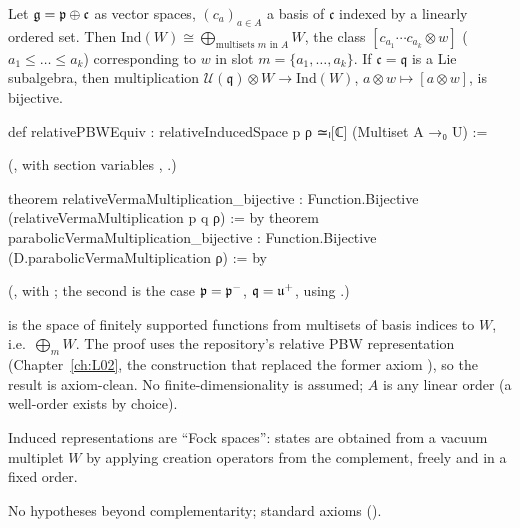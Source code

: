 \begin{theorem}\label{ch18:thm:relpbw}
Let $\mathfrak{g}=\mathfrak{p}\oplus\mathfrak c$ as vector spaces, $(c_a)_{a\in A}$ a basis of $\mathfrak c$ indexed by a linearly ordered set.  Then
$\mathrm{Ind}(W)\cong\bigoplus_{\text{multisets }m\text{ in }A}W$, the class $[c_{a_1}\cdots c_{a_k}\otimes w]$ ($a_1\le\dots\le a_k$) corresponding to $w$ in
slot $m=\{a_1,\dots,a_k\}$.  If $\mathfrak c=\mathfrak q$ is a Lie subalgebra, then multiplication
$\mathcal U(\mathfrak q)\otimes W\to \mathrm{Ind}(W)$, $a\otimes w\mapsto[a\otimes w]$, is bijective.
\end{theorem}
\begin{leancode}
def relativePBWEquiv : relativeInducedSpace p ρ ≃ₗ[ℂ] (Multiset A →₀ U) :=
\end{leancode}
(, with section variables , \lean{[LinearOrder A]}.)
\begin{leancode}
theorem relativeVermaMultiplication_bijective :
    Function.Bijective (relativeVermaMultiplication p q ρ) := by
theorem parabolicVermaMultiplication_bijective :
    Function.Bijective (D.parabolicVermaMultiplication ρ) := by
\end{leancode}
(, with ; the
second is the case $\mathfrak{p}=\mathfrak{p}^-$, $\mathfrak q=\mathfrak{u}^+$, using .)
\begin{dictionary}
 is the space of finitely supported functions from multisets of basis indices to $W$, i.e.\
$\bigoplus_mW$.  The proof uses the repository's relative PBW representation  (Chapter~\ref{ch:L02},
the construction that replaced the former axiom \lean{VOA.pbw}), so the result is axiom-clean.  No finite-dimensionality is
assumed; $A$ is any linear order (a well-order exists by choice).
\end{dictionary}
\begin{physics}
Induced representations are ``Fock spaces'': states are obtained from a vacuum multiplet $W$ by applying creation operators
from the complement, freely and in a fixed order.
\end{physics}
\begin{status}No hypotheses beyond complementarity; standard axioms ().\end{status}

